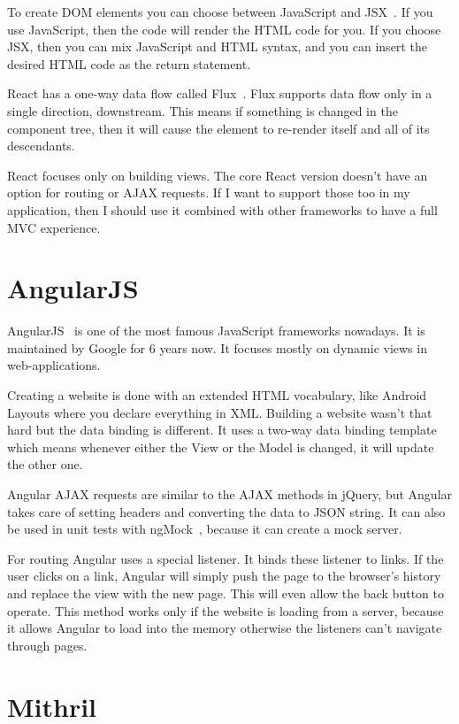To create DOM elements you can choose between JavaScript and JSX~\cite{JSX}. If you use JavaScript, then the code will render the HTML code for you. If you choose JSX, then you can mix JavaScript and HTML syntax, and you can insert the desired HTML code as the return statement. 

React has a one-way data flow called Flux~\cite{Flux}. Flux supports data flow only in a single direction, downstream. This means if something is changed in the component tree, then it will cause the element to re-render itself and all of its descendants.

React focuses only on building views. The core React version doesn't have an option for routing or AJAX requests. If I want to support those too in my application, then I should use it combined with other frameworks to have a full MVC experience.

\section{AngularJS}

AngularJS~\cite{Angular} is one of the most famous JavaScript frameworks nowadays.  It is maintained by Google for 6 years now. It focuses mostly on dynamic views in web-applications. 

Creating a website is done with an extended HTML vocabulary, like Android Layouts where you declare everything in XML. Building a website wasn't that hard but the data binding is different. It uses a two-way data binding template~\cite{Angular-Developer-DataBinding} which means whenever either the View or the Model is changed, it will update the other one.

Angular AJAX requests are similar to the AJAX methods in jQuery, but Angular takes care of setting headers and converting the data to JSON string. It can also be used in unit tests with ngMock~\cite{Angular-AJAX}, because it can create a mock server. 

For routing Angular uses a special listener. It binds these listener to links. If the user clicks on a link, Angular will simply push the page to the browser's history and replace the view with the new page. This will even allow the back button to operate. This method works only if the website is loading from a server, because it allows Angular to load into the memory otherwise the listeners can't navigate through pages.


\section{Mithril}

